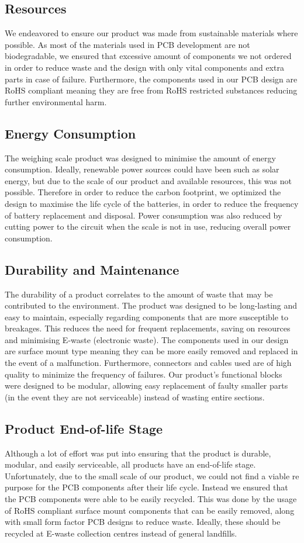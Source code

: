 \subsection{Resources}
We endeavored to ensure our product was made from sustainable materials where possible. As most of the materials used in PCB development are not biodegradable, we ensured that excessive amount of components we not ordered in order to reduce waste and the design with only vital components and extra parts in case of failure. Furthermore, the components used in our PCB design are RoHS compliant meaning they are free from RoHS restricted substances reducing further environmental harm.

\subsection{Energy Consumption}
The weighing scale product was designed to minimise the amount of energy consumption. Ideally, renewable power sources could have been such as solar energy, but due to the scale of our product and available resources, this was not possible. Therefore in order to reduce the carbon footprint, we optimized the design to maximise the life cycle of the batteries, in order to reduce the frequency of battery replacement and disposal. Power consumption was also reduced by 
cutting power to the circuit when the scale is not in use, reducing overall power consumption.

\subsection{Durability and Maintenance}
The durability of a product correlates to the amount of waste that may be contributed to the environment. The product was designed to be long-lasting and easy to maintain, especially regarding components that are more susceptible to breakages. This reduces the need for frequent replacements, saving on resources and minimising E-waste (electronic waste). The components used in our design are surface mount type meaning they can be more easily removed and replaced in the event of a malfunction. Furthermore, connectors and cables used are of high quality to minimize the frequency of failures. Our product's functional blocks were designed to be modular, allowing easy replacement of faulty smaller parts (in the event they are not serviceable) instead of wasting entire sections. 

\subsection{Product End-of-life Stage}
Although a lot of effort was put into ensuring that the product is durable, modular, and easily serviceable, all products have an end-of-life stage. Unfortunately, due to the small scale of our product, we could not find a viable re purpose for the PCB components after their life cycle. Instead we ensured that the PCB components were able to be easily recycled. This was done by the usage of RoHS compliant surface mount components that can be easily removed, along with small form factor PCB designs to reduce waste. Ideally, these should be recycled at E-waste collection centres instead of general landfills.


